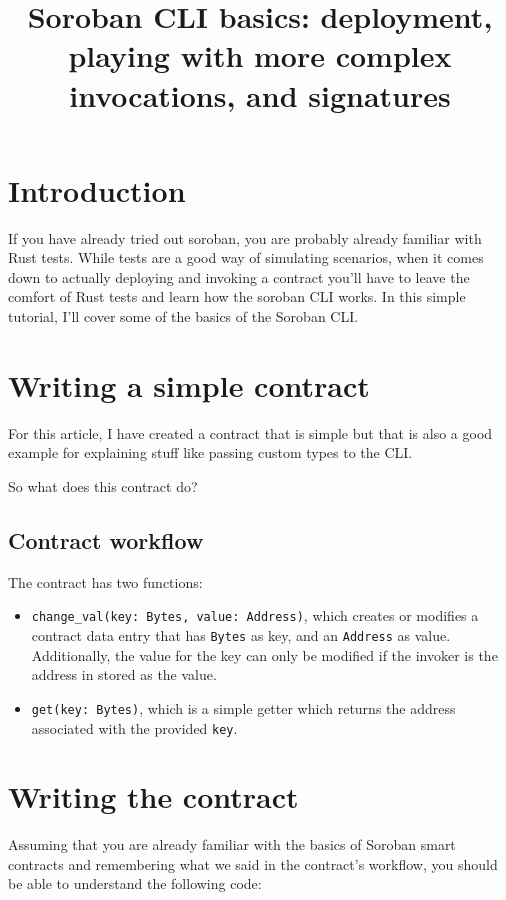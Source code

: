 \documentclass[10pt]{article}
\title{Soroban CLI basics: deployment, playing with more complex invocations, and signatures}
\author{}
\date{}
\begin{document}
\maketitle
\section*{Introduction}
If you have already tried out soroban, you are probably already familiar with Rust tests. While tests are a good way of simulating scenarios, when it comes down to actually deploying and invoking a contract you'll have to leave the comfort of Rust tests and learn how the soroban CLI works. In this simple tutorial, I'll cover some of the basics of the Soroban CLI.

\section*{Writing a simple contract}
For this article, I have created a contract that is simple but that is also a good example for explaining stuff like passing custom types to the CLI.

So what does this contract do?

\subsection*{Contract workflow}
The contract has two functions:

\begin{itemize}
  \item \texttt{change\_val(key: Bytes, value: Address)}, which creates or modifies a contract data entry that has \texttt{Bytes} as key, and an \texttt{Address} as value. Additionally, the value for the key can only be modified if the invoker is the address in stored as the value.
  \item \texttt{get(key: Bytes)}, which is a simple getter which returns the address associated with the provided \texttt{key}.
\end{itemize}

\section*{Writing the contract}
Assuming that you are already familiar with the basics of Soroban smart contracts and remembering what we said in the contract's workflow, you should be able to understand the following code:
\end{document}

